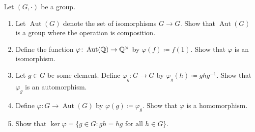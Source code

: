 \documentclass[../notes.tex]{subfiles}
\begin{document}
\begin{homework}
    Let $(G,\cdot)$ be a group.
    \begin{enumerate}[label=(\alph*)]
        \item Let $\operatorname{Aut}(G)$ denote the set of isomorphisms $G\to G$. Show that $\operatorname{Aut}(G)$ is a group where the operation is composition.
        \item Define the function $\varphi\colon\operatorname{Aut}(\mathbb Q)\to\mathbb Q^\times$ by $\varphi(f)\coloneqq f(1)$. Show that $\varphi$ is an isomorphism.
        \item Let $g\in G$ be some element. Define $\varphi_g\colon G\to G$ by $\varphi_g(h)\coloneqq ghg^{-1}$. Show that $\varphi_g$ is an automorphism.
        \item Define $\varphi\colon G\to\operatorname{Aut}(G)$ by $\varphi(g)\coloneqq\varphi_g$. Show that $\varphi$ is a homomorphism.
        \item Show that $\ker\varphi=\{g\in G:gh=hg\text{ for all }h\in G\}$.
    \end{enumerate}
\end{homework}

\end{document}

